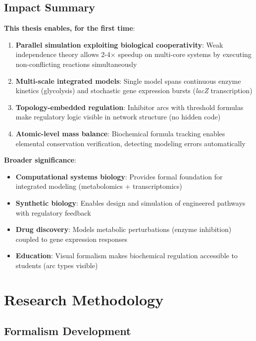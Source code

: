 \subsection{Impact Summary}
\label{subsec:impact-summary}

\textbf{This thesis enables, for the first time}:

\begin{enumerate}
    \item \textbf{Parallel simulation exploiting biological cooperativity}: Weak independence theory allows 2-4$\times$ speedup on multi-core systems by executing non-conflicting reactions simultaneously
    \item \textbf{Multi-scale integrated models}: Single model spans continuous enzyme kinetics (glycolysis) and stochastic gene expression bursts (\emph{lacZ} transcription)
    \item \textbf{Topology-embedded regulation}: Inhibitor arcs with threshold formulas make regulatory logic visible in network structure (no hidden code)
    \item \textbf{Atomic-level mass balance}: Biochemical formula tracking enables elemental conservation verification, detecting modeling errors automatically
\end{enumerate}

\textbf{Broader significance}:

\begin{itemize}
    \item \textbf{Computational systems biology}: Provides formal foundation for integrated modeling (metabolomics + transcriptomics)
    \item \textbf{Synthetic biology}: Enables design and simulation of engineered pathways with regulatory feedback
    \item \textbf{Drug discovery}: Models metabolic perturbations (enzyme inhibition) coupled to gene expression responses
    \item \textbf{Education}: Visual formalism makes biochemical regulation accessible to students (arc types visible)
\end{itemize}

\section{Research Methodology}
\label{sec:methodology}

\subsection{Formalism Development}
\label{subsec:formalism-development}


